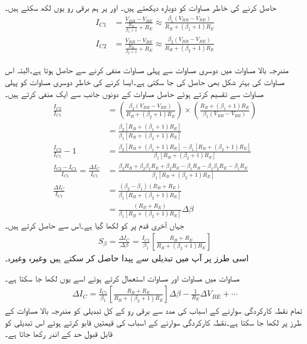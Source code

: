   حاصل کرنے کی خاطر مساوات   کو دوبارہ دیکھتے ہیں۔  اور  پر ہم برقی رو یوں لکھ سکتے ہیں۔
\begin{align}
I_{C1}&=\frac{V_{BB}-V_{BE}}{\frac{R_B}{\beta_1+1}+R_E} \approx \frac{\beta_1 \left (V_{BB}-V_{BE} \right )}{R_B+\left (\beta_1+1 \right ) R_E}\\
I_{C2}&=\frac{V_{BB}-V_{BE}}{\frac{R_B}{\beta_2+1}+R_E} \approx \frac{\beta_2 \left (V_{BB}-V_{BE} \right )}{R_B+\left (\beta_2+1 \right ) R_E}
\end{align}

مندرجہ بالا مساوات میں دوسری مساوات سے پہلی مساوات منفی کرنے سے  حاصل ہوتا ہے۔البتہ اس مساوات کی بہتر شکل بھی حاصل کی جا سکتی ہے۔ایسا کرنے کی خاطر دوسری مساوات کو پہلی مساوات سے تقسیم کرتے ہوئے حاصل مساوات کے دونوں جانب سے ایک   منفی کرتے ہیں۔
\begin{align*}
\frac{I_{C2}}{I_{C1}}&=\left (\frac{\beta_2 (V_{BB}-V_{BE})}{R_B+(\beta_2+1)R_E} \right ) \times \left (\frac{R_B+(\beta_1+1)R_E}{\beta_1  (V_{BB}-V_{BE})} \right ) \\
&=\frac{\beta_2 [R_B+(\beta_1+1)R_E]}{\beta_1[R_B+(\beta_2+1)R_E]}\\
\frac{I_{C2}}{I_{C1}} -1 &=\frac{\beta_2 [R_B+(\beta_1 +1)R_E]-\beta_1 [R_B+(\beta_2+1)R_E]}{\beta_1[R_B+(\beta_2+1)R_E]}\\
\frac{I_{C2}-I_{C1}}{I_{C1}}=\frac{\Delta I_C}{I_{C1}}&=\frac{\beta_2 R_B +\beta_2 \beta_1 R_E + \beta_2 R_E-\beta_1 R_B-\beta_1 \beta_2 R_E-\beta_1 R_E}{\beta_1[R_B+(\beta_2+1)R_E]}\\
\frac{\Delta I_C}{I_{C1}}&=\frac{\left (\beta_2-\beta_1 \right ) \left (R_B+R_E \right )}{\beta_1 [R_B +(\beta_2+1)R_E]}\\
&=\frac{ \left (R_B+R_E \right )}{\beta_1 [R_B +(\beta_2+1)R_E]} \Delta \beta
\end{align*}
جہاں آخری قدم پر  کو  لکھا گیا ہے۔اس سے  حاصل کرتے ہیں۔
\begin{align}\label{مساوات_ٹرانزسٹر_بیٹا_اسباب}
S_{\beta}=\frac{\Delta I_C}{\Delta \beta}=\frac{I_{C1}}{\beta_1} \left [\frac{R_B+R_E}{R_B+\left (\beta_2+1 \right )R_E} \right ]
\end{align}
اسی طرز پر آپ  میں تبدیلی سے پیدا  حاصل کر سکتے ہیں وغیرہ وغیرہ۔

مساوات  میں مساوات  اور مساوات  استعمال کرتے ہوئے اسے یوں لکھا جا سکتا ہے۔
\begin{align}\label{مساوات_ٹرانزسٹر_اسباب_سوارنے_کی_مساوات}
\Delta I_C = \frac{I_{C1}}{\beta_1} \left [\frac{R_B+R_E}{R_B+\left (\beta_2+1 \right )R_E} \right ] \Delta \beta-\frac{1}{R_E} \Delta V_{BE} +\cdots
\end{align}
تمام نقطہ کارکردگی سوارنے کے اسباب کی مدد سے برقی رو   کے کل تبدیلی کو مندرجہ بالا مساوات کے طرز پر لکھا جا سکتا ہے۔نقطہ کارکردگی سوارنے کے اسباب کی قیمتیں قابو کرتے ہوئے اس تبدیلی کو قابل قبول حد کے اندر رکھا جاتا ہے۔

